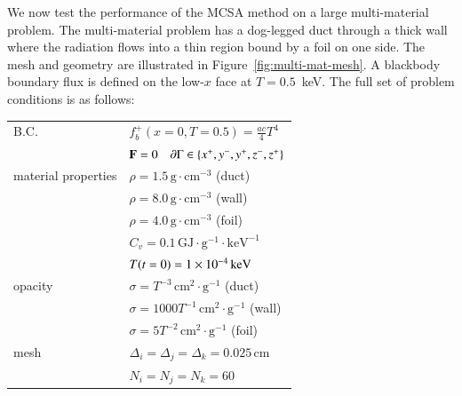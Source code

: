 \documentclass[preprint,12pt]{elsarticle}
\newcommand{\Cv}{\ensuremath{C_{v}}}
\newcommand{\Di}{\ensuremath{\Delta_i}}
\newcommand{\Dj}{\ensuremath{\Delta_j}}
\newcommand{\Dk}{\ensuremath{\Delta_k}}
\begin{document}
We now test the performance of the MCSA method on a large multi-material
problem.  The multi-material problem has a dog-legged duct through a thick
wall where the radiation flows into a thin region bound by a foil on one side.
The mesh and geometry are illustrated in Figure~\ref{fig:multi-mat-mesh}.  A
blackbody boundary flux is defined on the low-$x$ face at $T=0.5$~keV.  The
full set of problem conditions is as follows:
\begin{center}
  \begin{tabular}{ll}\hline
    B.C. & $f_b^{+}(x=0,T=0.5) = \frac{ac}{4}T^4$\\ & $\mathbf{F} =
    0\quad \partial\Gamma \in \{x^{+}, y^{-}, y^{+}, z^{-}, z^{+}\}$
    \\  material properties & $\rho =
    1.5\,\text{g}\cdot\text{cm}^{-3}$ (duct) \\ & $\rho =
    8.0\,\text{g}\cdot\text{cm}^{-3}$ (wall) \\ & $\rho =
    4.0\,\text{g}\cdot\text{cm}^{-3}$ (foil) \\ & $\Cv =
    0.1\,\text{GJ}\cdot\text{g}^{-1}\cdot\text{keV}^{-1}$\\ &
    $T(t=0) = 1\times 10^{-4}\,\text{keV}$\\  opacity & $\sigma =
    T^{-3}\,\text{cm}^2\cdot\text{g}^{-1}$ (duct) \\ & $\sigma =
    1000T^{-1}\,\text{cm}^2\cdot\text{g}^{-1}$ (wall) \\ & $\sigma =
    5T^{-2}\,\text{cm}^2\cdot\text{g}^{-1}$ (foil) \\  mesh & $\Di =
    \Dj = \Dk = 0.025\,\text{cm}$ \\ & $N_i = N_j = N_k = 60$
    \\ \hline
  \end{tabular}
\end{center}
\end{document}
